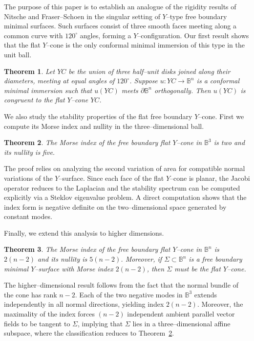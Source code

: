 \documentclass[11pt]{amsart}
\numberwithin{equation}{section}
\theoremstyle{theorem}
\newtheorem{theorem}{Theorem}[section]
\theoremstyle{definition}
\numberwithin{equation}{section}
\begin{document}
The purpose of this paper is to establish an analogue of the rigidity results 
of Nitsche and Fraser--Schoen in the singular setting of $Y$--type free boundary 
minimal surfaces. Such surfaces consist of three smooth faces meeting along a 
common curve with $120^\circ$ angles, forming a $Y$--configuration. Our first 
result shows that the flat $Y$--cone is the only conformal minimal immersion of 
this type in the unit ball.

\begin{theorem}\label{thm:main1}
Let $YC$ be the union of three half--unit disks joined along their diameters, 
meeting at equal angles of $120^\circ$. Suppose 
$u : YC \to \mathbb{B}^n$ is a conformal minimal immersion such that 
$u(YC)$ meets $\partial \mathbb{B}^n$ orthogonally. Then $u(YC)$ is 
congruent to the flat $Y$--cone $YC$.
\end{theorem}


We also study the stability properties of the flat free boundary $Y$--cone. 
First we compute its Morse index and nullity in the three--dimensional ball.

\begin{theorem}\label{thm:main2}
The Morse index of the free boundary flat $Y$--cone in $\mathbb{B}^3$ 
is two and its nullity is five.
\end{theorem}

The proof relies on analyzing the second variation of area for compatible
normal variations of the $Y$--surface. Since each face of the flat
$Y$--cone is planar, the Jacobi operator reduces to the Laplacian and the
stability spectrum can be computed explicitly via a Steklov eigenvalue
problem. A direct computation shows that the index form is negative definite on the 
two--dimensional space generated by constant modes.
\medskip

Finally, we extend this analysis to higher dimensions.

\begin{theorem}\label{thm:main2-n}
The Morse index of the free boundary flat $Y$--cone in $\mathbb{B}^n$ 
is $2(n-2)$ and its nullity is $5(n-2)$. Moreover, if 
$\Sigma \subset \mathbb{B}^n$ is a free boundary minimal $Y$--surface with 
Morse index $2(n-2)$, then $\Sigma$ must be the flat $Y$--cone.
\end{theorem}

The higher--dimensional result follows from the fact that the normal bundle of 
the cone has rank $n-2$. Each of the two negative modes in $\mathbb{B}^3$ 
extends independently in all normal directions, yielding index $2(n-2)$. 
Moreover, the maximality of the index forces $(n-2)$ independent ambient 
parallel vector fields to be tangent to $\Sigma$, implying that $\Sigma$ lies 
in a three--dimensional affine subspace, where the classification reduces to 
Theorem~\ref{thm:main2}.
\end{document}
